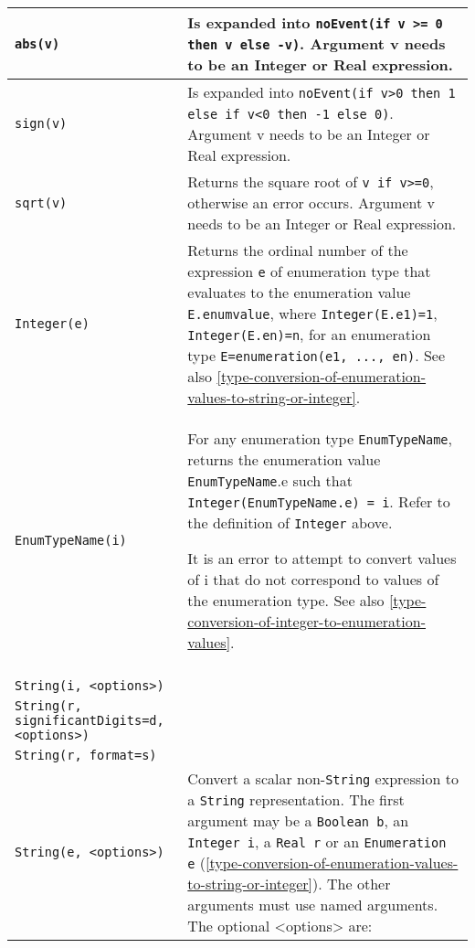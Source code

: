\begin{longtable}{|p{4.5cm}|p{10cm}|} \hline
\endhead
\lstinline!abs(v)! & Is expanded into \lstinline!noEvent(if v >= 0 then v else -v)!. Argument v needs to be an Integer or Real expression.\\ \hline
\lstinline!sign(v)! & Is expanded into \lstinline!noEvent(if v>0 then 1 else if v<0 then -1 else 0)!. Argument v needs to be an Integer or Real
expression.\\ \hline
\lstinline!sqrt(v)! & Returns the square root of \lstinline!v if v>=0!, otherwise
an error occurs. Argument v needs to be an Integer or Real
expression.\\ \hline

\lstinline!Integer(e)! & Returns the ordinal number of the expression \lstinline!e! of
enumeration type that evaluates to the enumeration value \lstinline!E.enumvalue!,
where \lstinline!Integer(E.e1)=1!, \lstinline!Integer(E.en)=n!, for an enumeration type
\lstinline!E=enumeration(e1, ..., en)!. See also \cref{type-conversion-of-enumeration-values-to-string-or-integer}.\\ \hline
\lstinline!EnumTypeName(i)! &
For any enumeration type \lstinline!EnumTypeName!, returns the enumeration
value \lstinline!EnumTypeName!.e such that \lstinline!Integer(EnumTypeName.e) = i!. Refer to the definition of
\lstinline!Integer! above.

It is an error to attempt to convert values of i that do not correspond
to values of the enumeration type. See also \cref{type-conversion-of-integer-to-enumeration-values}.
\\ \hline

\begin{tabular}{@{}p{4.5cm}@{}}
\lstinline!String(b, <options>)!\\
\lstinline!String(i, <options>)!\\
\lstinline!String(r,!
\hspace*{1ex}\lstinline!significantDigits=d,!
\hspace*{1ex}\lstinline!<options>)!\\
\lstinline!String(r, format=s)!\\
\lstinline!String(e, <options>)!
\end{tabular}
&
Convert a scalar non-\lstinline!String! expression to a \lstinline!String! representation. The
first argument may be a \lstinline!Boolean b!, an \lstinline!Integer i!, a \lstinline!Real r! or an
\lstinline!Enumeration e! (\cref{type-conversion-of-enumeration-values-to-string-or-integer}). The other arguments must use named
arguments. The optional \textless{}options\textgreater{} are:


\end{longtable}
